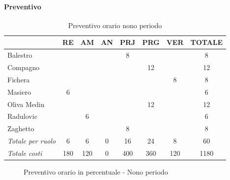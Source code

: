 \documentclass[a4paper,12pt]{article}
\begin{document}
            \paragraph{Preventivo}
                \begin{table}[H]
                \centering
                \caption{Preventivo orario nono periodo}
                \begin{tabular}{|l|c|c|c|c|c|c|c|}
                \hline
                    \rowcolor{lightgray}{\textbf{Membro}} & {\textbf{RE}} & {\textbf{AM}} & {\textbf{AN}} & {\textbf{PRJ}} & {\textbf{PRG}} & {\textbf{VER}} & {\textbf{TOTALE}}\\
                \hline
                    Balestro & & & & 8 & & & 8\\
                \hline
                    Compagno & & & & & 12 & & 12\\
                \hline
                    Fichera & & & & & & 8 & 8\\
                \hline
                    Masiero & 6 & & & & & & 6\\
                \hline
                    Oliva Medin & & & & & 12 & & 12\\
                \hline
                    Radulovic & & 6 & & & & & 6\\
                \hline
                    Zaghetto & & & & 8 & & & 8\\
                \hline
                    \rowcolor{lightgray}\textit{Totale per ruolo} & 6 & 6 & 0 & 16 & 24 & 8 & 60\\
                \hline
                    \rowcolor{lightgray}\textit{Totale costi} & 180 & 120 & 0 & 400 & 360 & 120 & 1180\\
                \hline
                \end{tabular}
                \end{table}

                \begin{figure}[H]
                \centering
                \caption{Preventivo orario in percentuale - Nono periodo}
                \end{figure}
                
\end{document}
